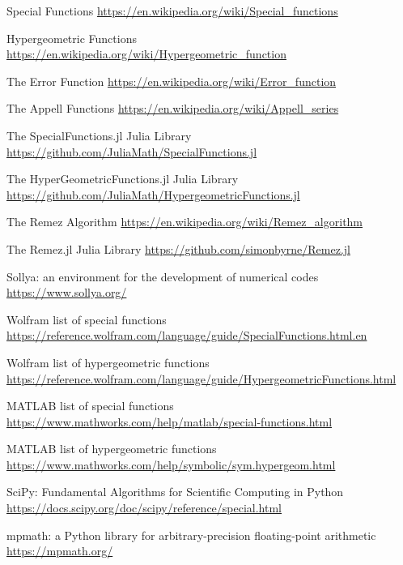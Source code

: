 \documentclass{article}
\theoremstyle{mytheoremstyle}
\theoremstyle{mytheoremstyle}
\theoremstyle{myproblemstyle}
\begin{document}
    \begin{thebibliography}{9}
      Special Functions \url{https://en.wikipedia.org/wiki/Special_functions}  

      Hypergeometric Functions \url{https://en.wikipedia.org/wiki/Hypergeometric_function}

      The Error Function \url{https://en.wikipedia.org/wiki/Error_function}

      The Appell Functions \url{https://en.wikipedia.org/wiki/Appell_series}
      
      The SpecialFunctions.jl Julia Library \url{https://github.com/JuliaMath/SpecialFunctions.jl}

      The HyperGeometricFunctions.jl Julia Library \url{https://github.com/JuliaMath/HypergeometricFunctions.jl}

      The Remez Algorithm \url{https://en.wikipedia.org/wiki/Remez_algorithm}

      The Remez.jl Julia Library \url{https://github.com/simonbyrne/Remez.jl}

      Sollya: an environment for the development of numerical codes \url{https://www.sollya.org/}

      Wolfram list of special functions \url{https://reference.wolfram.com/language/guide/SpecialFunctions.html.en}

      Wolfram list of hypergeometric functions \url{https://reference.wolfram.com/language/guide/HypergeometricFunctions.html}

      MATLAB list of special functions \url{https://www.mathworks.com/help/matlab/special-functions.html}

      MATLAB list of hypergeometric functions \url{https://www.mathworks.com/help/symbolic/sym.hypergeom.html}

      {{SciPy}: Fundamental Algorithms for Scientific Computing in Python} \url{https://docs.scipy.org/doc/scipy/reference/special.html}

      mpmath: a {P}ython library for arbitrary-precision floating-point arithmetic \url{https://mpmath.org/}


\end{thebibliography}
\end{document}
